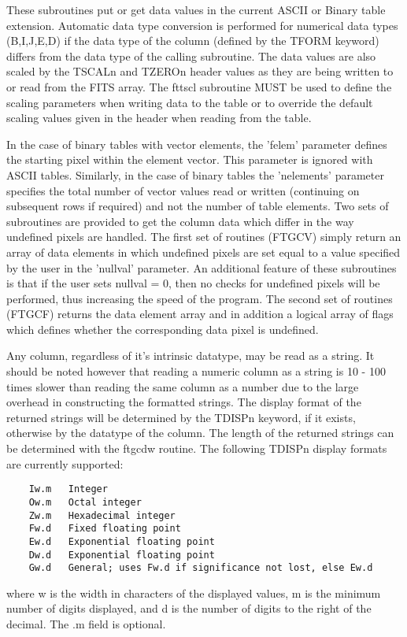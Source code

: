 \documentclass[11pt]{book}
\begin{document}
These subroutines put or get data values in the current ASCII or Binary table
extension.  Automatic data type conversion is performed for numerical data
types (B,I,J,E,D) if the data type of the column (defined by the TFORM keyword)
differs from the data type of the calling subroutine.  The data values are also
scaled by the TSCALn and TZEROn header values as they are being written to
or read from the FITS array.  The fttscl subroutine MUST be used to define the
scaling parameters when writing data to the table or to override the default
scaling values given in the header
when reading from the table.

    In the case of binary tables with vector elements, the 'felem'
parameter defines the starting pixel within the element vector.  This
parameter is ignored with ASCII tables. Similarly, in the case of
binary tables the 'nelements' parameter specifies the total number of
vector values read or written (continuing on subsequent rows if
required) and not the number of table elements.  Two sets of
subroutines are provided to get the column data which differ in the way
undefined pixels are handled.  The first set of routines (FTGCV)
simply return an array of data elements in which undefined pixels are
set equal to a value specified by the user in the 'nullval' parameter.
An additional feature of these subroutines is that if the user sets
nullval = 0, then no checks for undefined pixels will be performed,
thus increasing the speed of the program.  The second set of routines
(FTGCF) returns the data element array and in addition a logical array
of flags which defines whether the corresponding data pixel is undefined.

    Any column, regardless of it's intrinsic datatype, may be read as a
    string.  It should be noted however that reading a numeric column
    as a string is 10 - 100 times slower than reading the same column as
    a number due to the large overhead in constructing the formatted
    strings.    The display format of the returned strings will be
    determined by the TDISPn keyword, if it exists, otherwise by the
    datatype of the column.  The length of the returned strings can be
    determined with the ftgcdw routine.  The following TDISPn display
    formats are currently supported:

\begin{verbatim}
    Iw.m   Integer
    Ow.m   Octal integer
    Zw.m   Hexadecimal integer
    Fw.d   Fixed floating point
    Ew.d   Exponential floating point
    Dw.d   Exponential floating point
    Gw.d   General; uses Fw.d if significance not lost, else Ew.d
\end{verbatim}
  where w is the width in characters of the displayed values, m is the minimum
  number of digits displayed, and d is the number of digits to the right of the
  decimal.  The .m field is optional.
\end{document}
